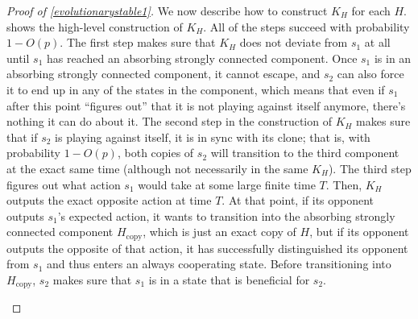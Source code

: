 \documentclass[12pt]{article}
\theoremstyle{definition}
\theoremstyle{remark}
\begin{document}
\begin{proof}[Proof of \cref{evolutionarystable1}]
      We now describe how to construct $K_H$ for each $H$.  shows the high-level construction of $K_H$.
       All of the steps succeed with probability $1 - O(p)$. The first step makes sure that $K_H$ does not deviate from $s_1$ at all
        until $s_1$ has reached an absorbing strongly connected component. 
       Once $s_1$ is in an absorbing strongly connected component, it cannot escape, and $s_2$ can also force it to end up in any of the states in the component, which means that even if $s_1$ after this point ``figures out'' that it is not playing against itself anymore, there's nothing it can do about it.
      The second step in the construction of $K_H$ makes sure that if $s_2$ is playing against itself, it is in sync with its clone; that is, with probability $1 - O(p)$, both copies of $s_2$ will transition to the third component at the exact same time (although not necessarily in the same $K_H$). 
      The third step figures out what action $s_1$ would take at some large finite time $T$. 
      Then, $K_H$ outputs the exact opposite action at time $T$. 
      At that point, if its opponent outputs $s_1$'s expected action, it wants to transition into the absorbing strongly connected component $H_\text{copy}$, which is just an exact copy of $H$, but if its opponent outputs the opposite of that action, it has successfully distinguished its opponent from $s_1$ and thus enters an always cooperating state.
      Before transitioning into $H_\text{copy}$, $s_2$ makes sure that $s_1$ is in a state that is beneficial for $s_2$.

      \begin{figure}
        \centering
\end{figure}
\end{proof}
\end{document}
